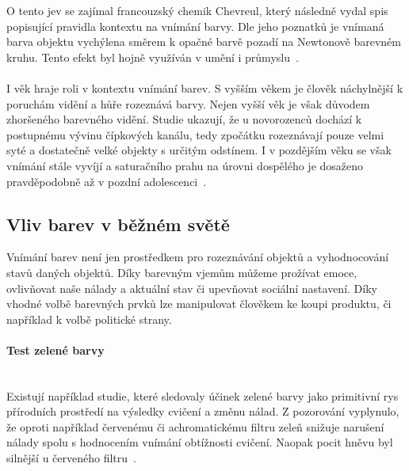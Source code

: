 O tento jev se zajímal francouzský chemik Chevreul, který následně vydal spis popisující pravidla kontextu na vnímání barvy.
Dle jeho poznatků je vnímaná barva objektu vychýlena směrem k opačné barvě pozadí na Newtonově barevném kruhu. Tento efekt byl hojně
využíván v umění i průmyslu~\cite{BEAULOTTO2002609}.
\\
\\
I věk hraje roli v kontextu vnímání barev. S vyšším věkem je člověk náchylnější k poruchám vidění a hůře rozeznává barvy. Nejen vyšší věk
je však důvodem zhoršeného barevného vidění. Studie ukazují, že u novorozenců dochází k postupnému vývinu čípkových kanálu, tedy zpočátku
rozeznávají pouze velmi syté a dostatečně velké objekty s určitým odstínem. I v pozdějším věku se však vnímání stále vyvíjí a saturačního prahu
na úrovni dospělého je dosaženo pravděpodobně až v pozdní adolescenci~\cite{infant-perception}.


\subsection{Vliv barev v běžném světě}
Vnímání barev není jen prostředkem pro rozeznávání objektů a vyhodnocování stavů daných objektů. Díky barevným vjemům můžeme
prožívat emoce, ovlivňovat naše nálady a aktuální stav či upevňovat sociální nastavení. Díky vhodné volbě barevných prvků lze
manipulovat člověkem ke koupi produktu, či například k volbě politické strany.
\paragraph{Test zelené barvy}\mbox{}\\
Existují například studie, které sledovaly účinek zelené barvy jako primitivní rys přírodních prostředí na výsledky cvičení a změnu
nálad. Z pozorování vyplynulo, že oproti například červenému či achromatickému filtru zeleň snižuje narušení nálady spolu s hodnocením
vnímání obtížnosti cvičení. Naopak pocit hněvu byl silnější u červeného filtru~\cite{Akers2012}.

